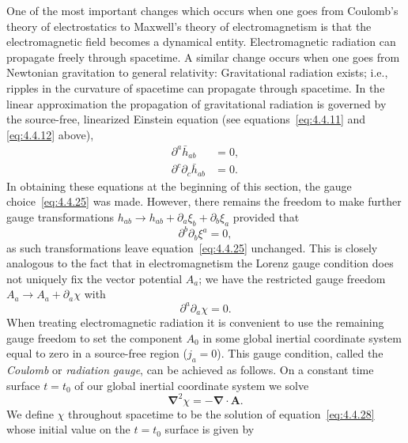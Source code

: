 One of the most important changes which occurs when one goes from Coulomb's
theory of electrostatics to Maxwell's theory of electromagnetism is that the
electromagnetic field becomes a dynamical entity. Electromagnetic radiation can
propagate freely through spacetime. A similar change occurs when one goes from
Newtonian gravitation to general relativity: Gravitational radiation exists; i.e.,
ripples in the curvature of spacetime can propagate through spacetime. In the
linear approximation
the propagation of gravitational radiation is governed by the source-free,
linearized Einstein equation (see equations~\eqref{eq:4.4.11} and
\eqref{eq:4.4.12} above),
\begin{align}
  \partial^a\bar h_{ab}&=0 ,
    \tag{4.4.25}\label{eq:4.4.25}\\
  \partial^c\partial_c\bar h_{ab}&=0 .
    \tag{4.4.26}\label{eq:4.4.26}
\end{align}
In obtaining these equations at the beginning of this section, the gauge
choice~\eqref{eq:4.4.25} was made. However, there remains the freedom to make
further gauge transformations
\(h_{ab}\longrightarrow h_{ab}+\partial_a\xi_b+\partial_b\xi_a\) provided that
\begin{equation}
  \partial^b\partial_b\xi^a=0 ,
  \tag{4.4.27}\label{eq:4.4.27}
\end{equation}
as such transformations leave equation~\eqref{eq:4.4.25} unchanged. This is
closely analogous to the fact that in electromagnetism the Lorenz gauge condition
does not uniquely fix the vector potential \(A_a\); we have the restricted gauge
freedom \(A_a\longrightarrow A_a+\partial_a\chi\) with
\begin{equation}
  \partial^a\partial_a\chi=0 .
  \tag{4.4.28}\label{eq:4.4.28}
\end{equation}
When treating electromagnetic radiation it is convenient to use the remaining gauge
freedom to set the component \(A_0\) in some global inertial coordinate system
equal to zero in a source-free region (\(j_a=0\)). This gauge condition, called the
\emph{Coulomb} or \emph{radiation gauge}, can be achieved as follows. On a
constant time surface \(t=t_0\) of our global inertial coordinate system we solve
\begin{equation}
  \boldsymbol{\nabla}^2\chi=-\boldsymbol{\nabla}\mathbin{\cdot}\mathbf{A} .
  \tag{4.4.29}\label{eq:4.4.29}
\end{equation}
We define \(\chi\) throughout spacetime to be the solution of
equation~\eqref{eq:4.4.28} whose initial value on the \(t=t_0\) surface is given by
